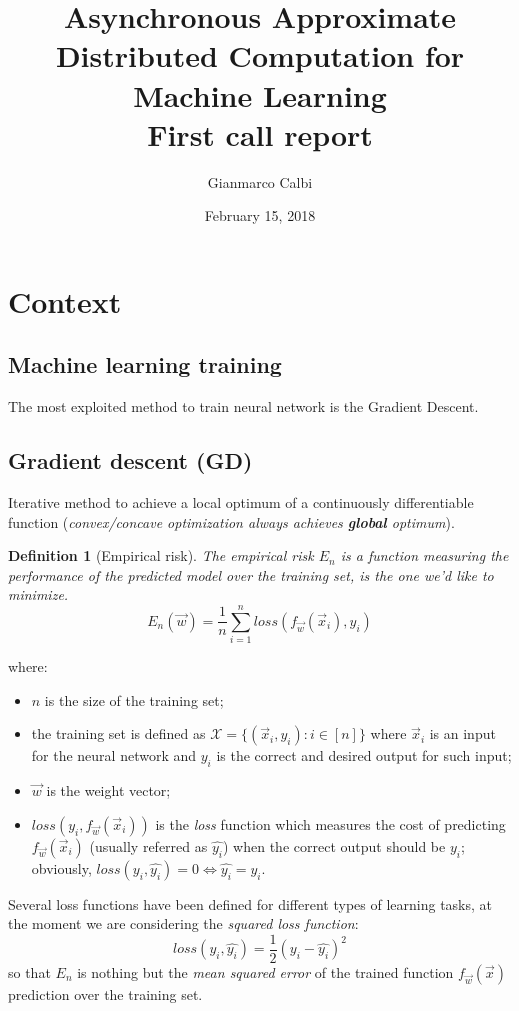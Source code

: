 \documentclass[a4paper,12pt]{article}
\title{%
  Asynchronous Approximate Distributed Computation for Machine Learning  \\
  First call report}
\author{Gianmarco Calbi}
\date{February 15, 2018}
\theoremstyle{newplanestyle}
\theoremstyle{newdefinitionstyle}
\newtheorem*{newdef*}{Definition}
\theoremstyle{newprovestyle}
\begin{document}
\maketitle

\section*{Context}
\subsection*{Machine learning training}
The most exploited method to train neural network is the Gradient Descent.

\subsection*{Gradient descent (GD)}
Iterative method to achieve a local optimum of a continuously differentiable function (\textit{convex/concave optimization always achieves \textbf{global} optimum}).

\begin{newdef*}[Empirical risk]
The \textit{empirical risk} $E_n$ is a function measuring the performance of the predicted model over the training set, is the one we'd like to minimize.
\[
E_n(\vec{w})=\frac{1}{n}\sum_{i=1}^{n}loss(f_{\vec{w}}(\vec{x}_i),y_i)
\]
\end{newdef*}
where:
\begin{itemize}
\item $n$ is the size of the training set;
\item the training set is defined as $\mathcal{X} = \{(\vec{x}_i, y_i) : i \in [n]\}$ where $\vec{x}_i$ is an input for the neural network and $y_i$ is the correct and desired output for such input;
\item $\vec{w}$ is the weight vector;
\item $loss(y_i, f_{\vec{w}}(\vec{x}_i))$ is the \textit{loss} function which measures the cost of predicting $f_{\vec{w}}(\vec{x}_i)$ (usually referred as $\hat{y_i}$) when the correct output should be $y_i$; obviously, $loss(y_i, \hat{y_i})=0 \Leftrightarrow \hat{y_i} = y_i$.
\end{itemize}

Several loss functions have been defined for different types of learning tasks, at the moment we are considering the \textit{squared loss function}:
\[
loss(y_i, \hat{y_i}) = \frac{1}{2}(y_i - \hat{y_i})^2
\]
so that $E_n$ is nothing but the \textit{mean squared error} of the trained function $f_{\vec{w}}(\vec{x})$ prediction over the training set.
\end{document}
